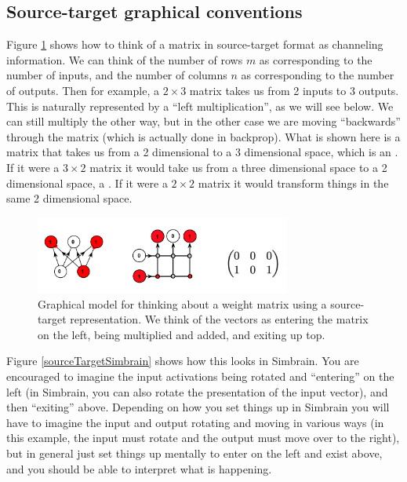 \subsection{Source-target graphical conventions}

Figure \ref{sourceTargetConvention} shows how to think of a matrix in source-target format as channeling information.  We can think of the number of rows $m$ as corresponding to the number of inputs, and the number of columns $n$ as corresponding to the number of outputs.  Then for example, a $2 \times 3$ matrix takes us from 2 inputs to 3 outputs. This is naturally represented by a ``left multiplication'', as we will see below. We can still multiply the other way, but in the other case we are moving ``backwards'' through the matrix (which is actually done in backprop).  What is shown here is a matrix that takes us from a 2 dimensional to a 3 dimensional space, which is an .  If it were a $3 \times 2$ matrix it would take us from a three dimensional space to a 2 dimensional space, a . If it were a $2 \times 2$ matrix it would transform things in the same 2 dimensional space.

\begin{figure}[h]
\centering
\includegraphics[width=0.75\textwidth]{images/sourceTarget.png}
\caption[Jeff Yoshimi.]{Graphical model for thinking about a weight matrix using a source-target representation. We think of the vectors as entering the matrix on the left, being multiplied and added, and exiting up top.}
\label{sourceTargetConvention}
\end{figure}

Figure \ref{sourceTargetSimbrain} shows how this looks in Simbrain. You are encouraged to imagine  the input activations being rotated and ``entering'' on the left (in Simbrain, you can also rotate the presentation of the input vector), and then ``exiting'' above.  Depending on how you set things up in Simbrain you will have to imagine the input and output rotating and moving in various ways (in this example, the input must rotate and the output must move over to the right), but in general just set things up mentally to enter on the left and exist above, and you should be able to interpret what is happening.

